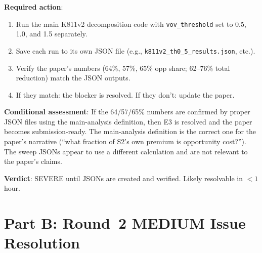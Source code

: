 \documentclass[12pt,a4paper]{article}
\begin{document}
\textbf{Required action}:
\begin{enumerate}[leftmargin=2em]
\item Run the main K811v2 decomposition code with \texttt{vov\_threshold} set to 0.5, 1.0, and 1.5 separately.
\item Save each run to its own JSON file (e.g., \texttt{k811v2\_th0\_5\_results.json}, etc.).
\item Verify the paper's numbers (64\%, 57\%, 65\% opp share; 62--76\% total reduction) match the JSON outputs.
\item If they match: the blocker is resolved. If they don't: update the paper.
\end{enumerate}

\textbf{Conditional assessment}: If the 64/57/65\% numbers are confirmed by proper JSON files using the main-analysis definition, then E3 is resolved and the paper becomes submission-ready. The main-analysis definition is the correct one for the paper's narrative (``what fraction of S2's own premium is opportunity cost?''). The sweep JSONs appear to use a different calculation and are not relevant to the paper's claims.

\textbf{Verdict}: \textcolor{errorred}{SEVERE until JSONs are created and verified.} Likely resolvable in $<1$ hour.

\bigskip

\section*{Part B: Round~2 MEDIUM Issue Resolution}
\end{document}
